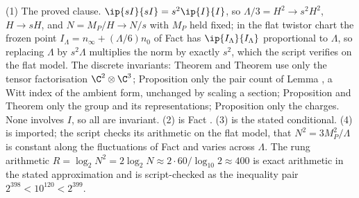 (1) The proved clause. $\ip{sI}{sI} = s^{2}\ip{I}{I}$, so $\Lambda/3 = H^{2} \to s^{2}H^{2}$, $H \to sH$, and $N = M_{P}/H \to N/s$ with $M_{P}$ held fixed; in the flat twistor chart the frozen point $I_{\Lambda} = n_{\infty} + (\Lambda/6)n_{0}$ of Fact  has $\ip{I_{\Lambda}}{I_{\Lambda}}$ proportional to $\Lambda$, so replacing $\Lambda$ by $s^{2}\Lambda$ multiplies the norm by exactly $s^{2}$, which the script verifies on the flat model. The discrete invariants: Theorem  and Theorem  use only the tensor factorisation $\C^{2} \otimes \C^{3}$; Proposition  only the pair count of Lemma , a Witt index of the ambient form, unchanged by scaling a section; Proposition  and Theorem  only the group and its representations; Proposition  only the charges. None involves $I$, so all are invariant. (2) is Fact . (3) is the stated conditional. (4) is imported; the script checks its arithmetic on the flat model, that $N^{2} = 3M_{P}^{2}/\Lambda$ is constant along the fluctuations of Fact  and varies across $\Lambda$. The rung arithmetic $R = \log_{2}N^{2} = 2\log_{2}N \approx 2 \cdot 60/\log_{10}2 \approx 400$ is exact arithmetic in the stated approximation and is script-checked as the inequality pair $2^{398} < 10^{120} < 2^{399}$.
